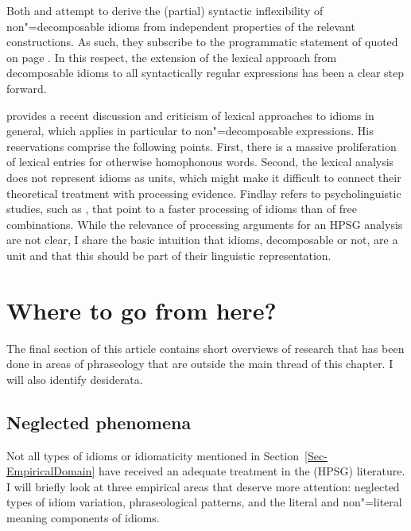 \documentclass[output=paper,biblatex,babelshorthands,newtxmath,draftmode,colorlinks,citecolor=brown]{langscibook}
\begin{document}
\largerpage[1.3]
Both \citet{KSF2015a} and \citet{Bargmann:Sailer:18} attempt to derive the (partial) syntactic
inflexibility of non"=decomposable idioms from independent properties of the relevant constructions.
As such, they subscribe to the programmatic statement of \citet{NSW94a} quoted on page
\pageref{NSW-quote}.  In this respect, the extension of the lexical approach from decomposable
idioms to all syntactically regular expressions has been a clear step forward.

\citet{Findlay:17} provides a recent discussion and criticism of lexical approaches to idioms in
general, which applies in particular to non"=decomposable expressions.  His reservations comprise
the following points.  First, there is a massive proliferation of lexical entries for otherwise
homophonous words.
%
Second, the lexical analysis does not represent idioms as units, which might make it difficult to
connect their theoretical treatment with processing evidence.  Findlay refers to psycholinguistic
studies, such as \citet{Swinney:Cutler:79}, that point to a faster processing of idioms than of free
combinations.  While the relevance of processing arguments for an HPSG analysis are not clear, I
share the basic intuition that idioms, decomposable or not, are a unit and that this should be part
of their linguistic representation.


\section{Where to go from here?}
\label{Sec-WhereToGo}

The final section of this article contains short overviews of research that has been done in areas
of phraseology that are outside the main thread of this chapter. I will also identify desiderata.


\subsection{Neglected phenomena}
\label{Sec-Neglected}

Not all types of idioms or idiomaticity mentioned in Section~\ref{Sec-EmpiricalDomain} have received
an adequate treatment in the (HPSG) literature.  I will briefly look at three empirical areas that
deserve more attention: neglected types of idiom variation, phraseological patterns, and the literal
and non"=literal meaning components of idioms.
\end{document}
